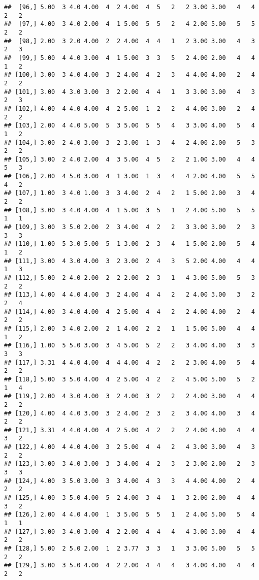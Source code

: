 \documentclass[]{article}
\begin{document}
\begin{verbatim}
##  [96,] 5.00  3 4.0 4.00  4  2 4.00  4  5   2   2 3.00 3.00   4   4   2   2
##  [97,] 4.00  3 4.0 2.00  4  1 5.00  5  5   2   4 2.00 5.00   5   5   2   2
##  [98,] 2.00  3 2.0 4.00  2  2 4.00  4  4   1   2 3.00 3.00   4   3   2   3
##  [99,] 5.00  4 4.0 3.00  4  1 5.00  3  3   5   2 4.00 2.00   4   4   1   2
## [100,] 3.00  3 4.0 4.00  3  2 4.00  4  2   3   4 4.00 4.00   2   4   2   2
## [101,] 3.00  4 3.0 3.00  3  2 2.00  4  4   1   3 3.00 3.00   4   3   2   3
## [102,] 4.00  4 4.0 4.00  4  2 5.00  1  2   2   4 4.00 3.00   2   4   2   2
## [103,] 2.00  4 4.0 5.00  5  3 5.00  5  5   4   3 3.00 4.00   5   4   1   2
## [104,] 3.00  2 4.0 3.00  3  2 3.00  1  3   4   2 4.00 2.00   5   3   2   2
## [105,] 3.00  2 4.0 2.00  4  3 5.00  4  5   2   2 1.00 3.00   4   4   5   3
## [106,] 2.00  4 5.0 3.00  4  1 3.00  1  3   4   4 2.00 4.00   5   5   4   2
## [107,] 1.00  3 4.0 1.00  3  3 4.00  2  4   2   1 5.00 2.00   3   4   2   2
## [108,] 3.00  3 4.0 4.00  4  1 5.00  3  5   1   2 4.00 5.00   5   5   1   1
## [109,] 3.00  3 5.0 2.00  2  3 4.00  4  2   2   3 3.00 3.00   2   3   3   3
## [110,] 1.00  5 3.0 5.00  5  1 3.00  2  3   4   1 5.00 2.00   5   4   1   2
## [111,] 3.00  4 3.0 4.00  3  2 3.00  2  4   3   5 2.00 4.00   4   4   1   3
## [112,] 5.00  2 4.0 2.00  2  2 2.00  2  3   1   4 3.00 5.00   5   3   2   2
## [113,] 4.00  4 4.0 4.00  3  2 4.00  4  4   2   2 4.00 3.00   3   2   2   4
## [114,] 4.00  3 4.0 4.00  4  2 5.00  4  4   2   2 4.00 4.00   2   4   2   2
## [115,] 2.00  3 4.0 2.00  2  1 4.00  2  2   1   1 5.00 5.00   4   4   1   2
## [116,] 1.00  5 5.0 3.00  3  4 5.00  5  2   2   3 4.00 4.00   3   3   3   3
## [117,] 3.31  4 4.0 4.00  4  4 4.00  4  2   2   2 3.00 4.00   5   4   2   2
## [118,] 5.00  3 5.0 4.00  4  2 5.00  4  2   2   4 5.00 5.00   5   2   1   4
## [119,] 2.00  4 3.0 4.00  3  2 4.00  3  2   2   2 4.00 3.00   4   4   2   2
## [120,] 4.00  4 4.0 3.00  3  2 4.00  2  3   2   3 4.00 4.00   3   4   2   2
## [121,] 3.31  4 4.0 4.00  4  2 5.00  4  2   2   2 4.00 4.00   4   4   3   2
## [122,] 4.00  4 4.0 4.00  3  2 5.00  4  4   2   4 3.00 3.00   4   3   2   2
## [123,] 3.00  3 4.0 3.00  3  3 4.00  4  2   3   2 3.00 2.00   2   3   3   3
## [124,] 4.00  3 5.0 3.00  3  3 4.00  4  3   3   4 4.00 4.00   2   4   2   2
## [125,] 4.00  3 5.0 4.00  5  2 4.00  3  4   1   3 2.00 2.00   4   4   3   2
## [126,] 2.00  4 4.0 4.00  1  3 5.00  5  5   1   2 4.00 5.00   5   4   1   1
## [127,] 3.00  3 4.0 3.00  4  2 2.00  4  4   4   4 3.00 3.00   4   4   2   2
## [128,] 5.00  2 5.0 2.00  1  2 3.77  3  3   1   3 3.00 5.00   5   5   2   2
## [129,] 3.00  3 5.0 4.00  4  2 2.00  4  4   4   3 4.00 4.00   4   4   2   2

\end{verbatim}
\end{document}
